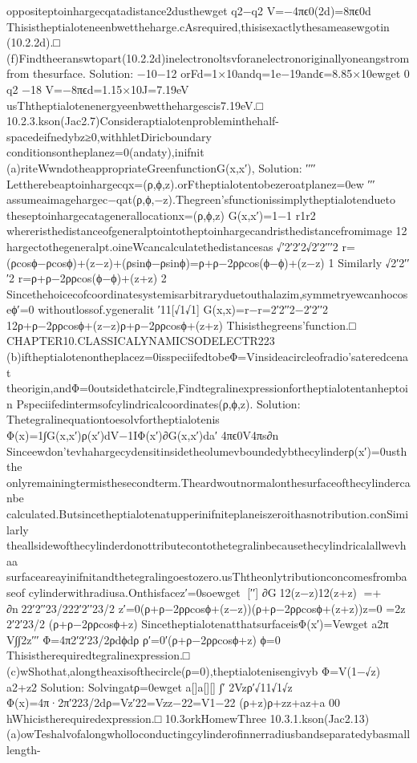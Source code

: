 {{{{{{{{{{{oppositeptoinhargecqatadistance2dusthewget
q2−q2
V=−4πϵ0(2d)=8πϵ0d
Thisistheptialoteneenbwettheharge.cAsrequired,thisisexactlythesameasewgotin
(10.2.2d).□
(f)Findtheeranswtopart(10.2.2d)inelectronoltsvforanelectronoriginallyoneangstromfrom
thesurface.
Solution:
−10−12
orFd=1×10andq=1e−19andϵ=8.85×10ewget
0
q2
−18
V=−8πϵd=1.15×10J=7.19eV
usThtheptialotenenergyeenbwetthehargescis7.19eV.□
10.2.3.kson(Jac2.7)Consideraptialotenprobleminthehalf-spacedeifnedybz≥0,withhletDiricboundary
conditionsontheplanez=0(andaty),inifnit
(a)riteWwndotheappropriateGreenfunctionG(x,x′),
Solution:
′′′′
Lettherebeaptoinhargecqx=(ρ,ϕ,z).orFtheptialotentobezeroatplanez=0ew
′′′
assumeaimagehargec−qat(ρ,ϕ,−z).Thegreen’sfunctionissimplytheptialotendueto
theseptoinhargecatagenerallocationx=(ρ,ϕ,z)
G(x,x′)=1−1
r1r2
whereristhedistanceofgeneralptointotheptoinhargecandristhedistancefromimage
12
hargectothegeneralpt.oineWcancalculatethedistancesas
√′2′2′2√2′2′′′2
r=(ρcosϕ−ρcosϕ)+(z−z)+(ρsinϕ−ρsinϕ)=ρ+ρ−2ρρcos(ϕ−ϕ)+(z−z)
1
Similarly
√2′2′′′2
r=ρ+ρ−2ρρcos(ϕ−ϕ)+(z+z)
2
Sincethehoicecofcoordinatesystemisarbitraryduetouthalazim,symmetryewcanhocoseϕ′=0
withoutlossof.ygeneralit
′11[√1√1]
G(x,x)=r−r=2′2′′2−2′2′′2
12ρ+ρ−2ρρcosϕ+(z−z)ρ+ρ−2ρρcosϕ+(z+z)
Thisisthegreens’function.□
CHAPTER10.CLASSICALYNAMICSODELECTR223
(b)iftheptialotenontheplacez=0isspeciifedtobeΦ=Vinsideacircleofradio’sateredcenat
theorigin,andΦ=0outsidethatcircle,Findtegralinexpressionfortheptialotentanheptoin
Pspeciifedintermsofcylindricalcoordinates(ρ,ϕ,z).
Solution:
Thetegralinequationtoesolvfortheptialotenis
Φ(x)=1∫G(x,x′)ρ(x′)dV−1IΦ(x′)∂G(x,x′)da′
4πϵ0V4πs∂n
Sinceewdon’tevhahargecydensitinsidetheolumevboundedybthecylinderρ(x′)=0usththe
onlyremainingtermisthesecondterm.Theardwoutnormalonthesurfaceofthecylindercanbe
calculated.Butsincetheptialotenatupperinifniteplaneiszeroithasnotribution.conSimilarly
theallsidewofthecylinderdonottributecontothetegralinbecausethecylindricalallwevhaa
surfaceareayinifnitandthetegralingoestozero.usThtheonlytributionconcomesfrombaseof
cylinderwithradiusa.Onthisfacez′=0soewget
[′′]
∂G12(z−z)12(z+z)
=+
∂n22′2′′23/222′2′′23/2
z′=0(ρ+ρ−2ρρcosϕ+(z−z))(ρ+ρ−2ρρcosϕ+(z+z))z=0
=2z
2′2′23/2
(ρ+ρ−2ρρcosϕ+z)
SincetheptialotenatthatsurfaceisΦ(x′)=Vewget
a2π
V∫∫2z′′′
Φ=4π2′2′23/2ρdϕdρ
ρ′=0′(ρ+ρ−2ρρcosϕ+z)
ϕ=0
Thisistherequiredtegralinexpression.□
(c)wShothat,alongtheaxisofthecircle(ρ=0),theptialotenisengivyb
Φ=V(1−√z)
a2+z2
Solution:
Solvingatρ=0ewget
a[]a[][]
∫′
2Vzρ′√11√1√z
Φ(x)=4π·2π′223/2dρ=Vz′22=Vzz−22=V1−22
(ρ+z)ρ+zz+az+a
00
hWhicistherequiredexpression.□
10.3orkHomewThree
10.3.1.kson(Jac2.13)
(a)owTeshalvofalongwholloconductingcylinderofinnerradiusbandseparatedybasmalllength-
}}}}}}}}}}}
